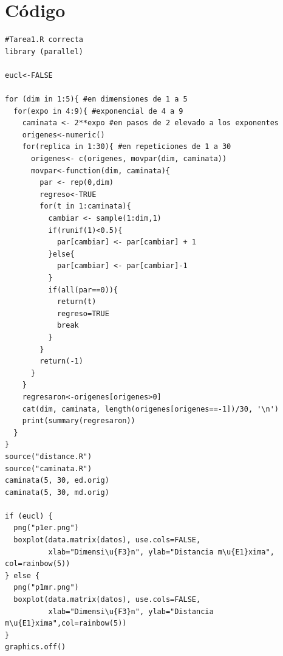\documentclass[12pt]{amsart}
\begin{document}
\section{Código}
\begin{lstlisting}
#Tarea1.R correcta
library (parallel)
 
eucl<-FALSE

for (dim in 1:5){ #en dimensiones de 1 a 5
  for(expo in 4:9){ #exponencial de 4 a 9
    caminata <- 2**expo #en pasos de 2 elevado a los exponentes
    origenes<-numeric()
    for(replica in 1:30){ #en repeticiones de 1 a 30
      origenes<- c(origenes, movpar(dim, caminata))
      movpar<-function(dim, caminata){
        par <- rep(0,dim)
        regreso<-TRUE
        for(t in 1:caminata){
          cambiar <- sample(1:dim,1)
          if(runif(1)<0.5){
            par[cambiar] <- par[cambiar] + 1
          }else{
            par[cambiar] <- par[cambiar]-1
          }
          if(all(par==0)){
            return(t)
            regreso=TRUE
            break
          }
        }
        return(-1)
      }
    }
    regresaron<-origenes[origenes>0]
    cat(dim, caminata, length(origenes[origenes==-1])/30, '\n')
    print(summary(regresaron))
  }
}
source("distance.R")
source("caminata.R")
caminata(5, 30, ed.orig)
caminata(5, 30, md.orig)

if (eucl) {
  png("p1er.png")
  boxplot(data.matrix(datos), use.cols=FALSE, 
          xlab="Dimensi\u{F3}n", ylab="Distancia m\u{E1}xima", col=rainbow(5))
} else {
  png("p1mr.png")
  boxplot(data.matrix(datos), use.cols=FALSE, 
          xlab="Dimensi\u{F3}n", ylab="Distancia m\u{E1}xima",col=rainbow(5))
}
graphics.off()



\end{lstlisting}
\end{document}
